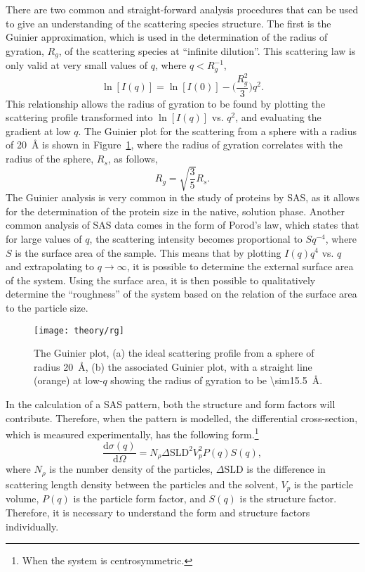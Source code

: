 There are two common and straight-forward analysis procedures that can be used to give an understanding of the scattering species structure.
The first is the Guinier approximation, which is used in the determination of the radius of gyration, $R_g$, of the scattering species at ``infinite dilution''.
This scattering law is only valid at very small values of $q$, where $q < R_g^{-1}$,\autocite{sivia_elementary_2011}
%
\begin{equation}
    \ln[I(q)] = \ln[I(0)] - \Bigg(\frac{R_g^2}{3}\Bigg)q^2.
\end{equation}
%
This relationship allows the radius of gyration to be found by plotting the scattering profile transformed into $\ln[I(q)]$ vs. $q^2$, and evaluating the gradient at low $q$.
The Guinier plot for the scattering from a sphere with a radius of \SI{20}{\angstrom} is shown in Figure~\ref{fig:rg}, where the radius of gyration correlates with the radius of the sphere, $R_s$, as follows,
%
\begin{equation}
    R_g = \sqrt{\frac{3}{5}}R_s.
\end{equation}
%
The Guinier analysis is very common in the study of proteins by SAS, as it allows for the determination of the protein size in the native, solution phase.\autocite{skou_synchrotron-based_2014}
Another common analysis of SAS data comes in the form of Porod's law, which states that for large values of $q$, the scattering intensity becomes proportional to $Sq^{-4}$, where $S$ is the surface area of the sample.
This means that by plotting $I(q)q^4$ vs. $q$ and extrapolating to $q \rightarrow \infty$, it is possible to determine the external surface area of the system.\autocite{willis_experimental_2009}
Using the surface area, it is then possible to qualitatively determine the ``roughness'' of the system based on the relation of the surface area to the particle size.
%
\begin{figure}[t]
    \centering
    \texttt{[image: theory/rg]}
    \caption{The Guinier plot, (a) the ideal scattering profile from a sphere of radius \SI{20}{\angstrom}, (b) the associated Guinier plot, with a straight line (orange) at low-$q$ showing the radius of gyration to be \SI{\sim15.5}{\angstrom}.}
    \label{fig:rg}
\end{figure}
%

In the calculation of a SAS pattern, both the structure and form factors will contribute.
Therefore, when the pattern is modelled, the differential cross-section, which is measured experimentally, has the following form.\footnote{When the system is centrosymmetric.}
%
\begin{equation}
    \frac{\text{d}\sigma(q)}{\text{d}\Omega} = N_\rho\Delta\text{SLD}^2V_p^2 P(q)S(q),
\end{equation}
%
where $N_\rho$ is the number density of the particles, $\Delta\text{SLD}$ is the difference in scattering length density between the particles and the solvent, $V_p$ is the particle volume, $P(q)$ is the particle form factor, and $S(q)$ is the structure factor.\autocite{pedersen_monte_2002}
Therefore, it is necessary to understand the form and structure factors individually.

